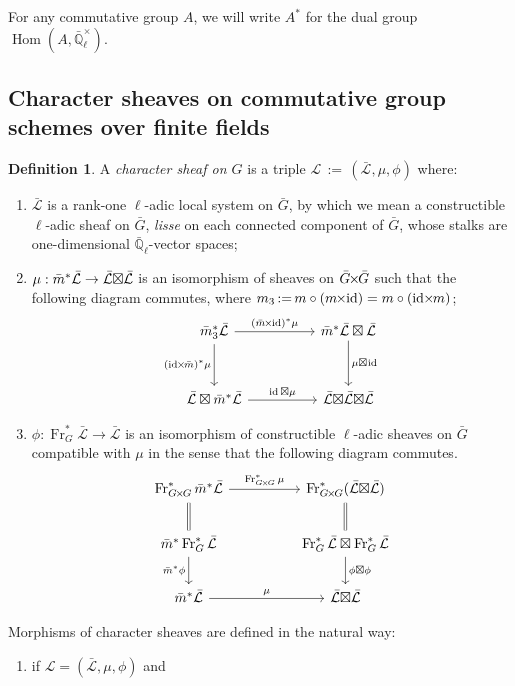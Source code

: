 \documentclass[10pt]{amsart}
\makeatletter
\theoremstyle{plain}
\theoremstyle{definition}
\newtheorem{definition}[theorem]{Definition}
\newcommand{\EE}{\mathbb{\bar Q}_\ell}
\newcommand{\EEx}{\EE^\times}
\newcommand{\Frob}[1]{\operatorname{Fr}_{#1}}
\DeclareMathOperator{\Hom}{Hom}
\DeclareMathOperator{\id}{id}
\newcommand{\ceq}{{\, :=\, }}
\newcommand{\cs}[1]{{\mathcal{#1}}}
\newcommand{\gcs}[1]{{\mathcal{\bar #1}}}
\newcommand{\labitem}[2]{
\def\@itemlabel{\textbf{#1}}
\item
\def\@currentlabel{#1}\label{#2}}
\newcommand{\bm}{\bar{m}}
\newcommand{\bG}{\bar{G}}
\newcommand{\tight}[3]{\hspace{-#1pt}{#2}\hspace{-#3pt}}
\newcommand{\bGxG}{\text{$\bar{G} \tight{1}{\times}{1} \bar{G}$}}
\newcommand{\GxxG}{\text{$G \tight{1}{\times}{1} G$}}
\newcommand{\LxL}{\text{$\gcs{L} \tight{0}{\boxtimes}{0} \gcs{L}$}}
\makeatother
\begin{document}
For any commutative group $A$, we will write $A^*$ for the dual group $\Hom(A, \EEx)$.

\subsection{Character sheaves on commutative group schemes over finite fields}\label{ssec:category}

\begin{definition}\label{def:CS}
A \emph{character sheaf on $G$} is a triple
$\cs{L}\ceq (\gcs{L},\mu,\phi)$ where:
\begin{enumerate}
\labitem{(CS.1)}{CS.1} $\gcs{L}$ is a rank-one $\ell$-adic local system on $\bG$, by which we mean a constructible
$\ell$-adic sheaf on $\bG$, {\it lisse} on each connected component of $\bG$, whose stalks are one-dimensional $\EE$-vector spaces;
\labitem{(CS.2)}{CS.2} $\mu: \bm^* \gcs{L} \to \LxL$ is an isomorphism of
sheaves on $\bGxG$ such that the following diagram commutes,
  where $m_3 \ceq m\circ (m\tight{1}{\times}{2}\id) = m\circ (\id\tight{2}{\times}{1} m)$;
  \[
  \begin{tikzcd}[row sep=30]
  \bm_3^*\gcs{L} \arrow{rr}{(\bm \tight{1}{\times}{2} \id)^*\mu} \arrow[swap]{d}{(\id \tight{2}{\times}{1} \bm)^*\mu}
    &&  \bm^*\gcs{L} \boxtimes \gcs{L} \dar{\mu \tight{0}{\boxtimes}{1} \id} \\
    \gcs{L} \boxtimes \bm^* \gcs{L} \arrow{rr}{\id \boxtimes \mu}
    &&  \gcs{L} \tight{0}{\boxtimes}{0} \LxL
  \end{tikzcd}
  \]
\labitem{(CS.3)}{CS.3} $\phi : \Frob{G}^* \gcs{L} \to \gcs{L}$ is an
  isomorphism of constructible $\ell$-adic sheaves on $\bG$ compatible with
  $\mu$ in the sense that the following diagram commutes.
  \[
  \begin{tikzcd}[row sep=20]
  \Frob{\GxxG}^* \bm^* \gcs{L} \arrow{rr}{\Frob{\GxxG}^*\mu}
    && \Frob{\GxxG}^*(\LxL)\\
    \arrow[equal]{u} \bm^*  \Frob{G}^* \gcs{L} \arrow[swap]{d}{\bm^* \phi}
    && \Frob{G}^*\gcs{L}\boxtimes \Frob{G}^*\gcs{L} \dar{\phi\boxtimes \phi} \arrow[equal]{u} \\
    \bm^*\gcs{L} \arrow{rr}{\mu}
    && \LxL
  \end{tikzcd}
  \]
\end{enumerate}
Morphisms of character sheaves are defined in the natural way:
\begin{enumerate}
\labitem{(CS.4)}{CS.4} if $\cs{L} = (\gcs{L},\mu,\phi)$ and

\end{enumerate}
\end{definition}
\end{document}
